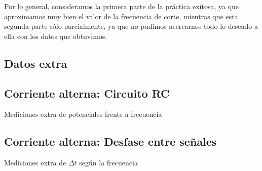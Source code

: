 \documentclass[12pt, a4paper, titlepage]{article}
\begin{document}
  Por lo general, consideramos la primera parte de la práctica exitosa, ya que aproximamos muy bien el valor de la frecuencia de corte, mientras que esta segunda parte sólo parcialmente, ya que no pudimos acercarnos todo lo deseado a ella con los datos que obtuvimos.



  \newpage
  \begin{appendices}
    \makeatletter

    \section{Datos extra}

    \subsection{Corriente alterna: Circuito RC}
    \label{extra1}

    \begin{table}[H]
    \centering
    \caption{Mediciones extra de potenciales frente a frecuencia}
    \end{table}

    \subsection{Corriente alterna: Desfase entre señales}
    \label{extra2}

    \begin{table}[H]
    \centering
    \caption{Mediciones extra de $\Delta t$ según la frecuencia}
    \end{table}



\end{appendices}
\end{document}
